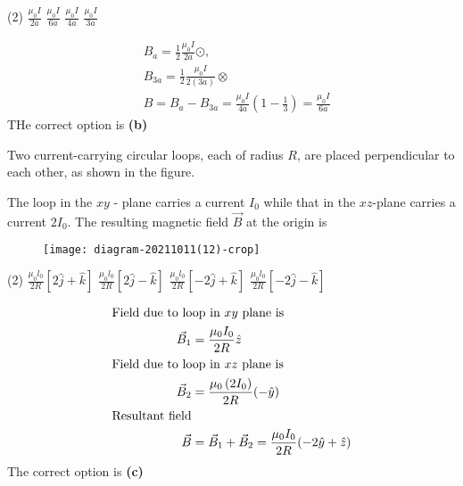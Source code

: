\begin{enumerate}
\begin{tasks}(2)
	\task[\textbf{A.}] $\frac{\mu_{0} I}{2 a}$
	\task[\textbf{B.}]$\frac{\mu_{0} I}{6 a}$
	\task[\textbf{C.}]$\frac{\mu_{0} I}{4 a}$
	\task[\textbf{D.}]$\frac{\mu_{0} I}{3 a}$
\end{tasks}
\begin{answer}
	\begin{align*}
	& B_{a}=\frac{1}{2} \frac{\mu_{0} I}{2 a} \odot,\\
	& B_{3 a}=\frac{1}{2} \frac{\mu_{0} I}{2(3 a)} \otimes \\
	&B=B_{a}-B_{3 a}=\frac{\mu_{0} I}{4 a}\left(1-\frac{1}{3}\right)=\frac{\mu_{0} I}{6 a}
	\end{align*}
	THe correct option is \textbf{(b)}	
\end{answer}
\begin{minipage}{\textwidth}
	\item Two current-carrying circular loops, each of radius $R$, are placed perpendicular to each other, as shown in the figure.
	
	The loop in the $x y$ - plane carries a current $I_{0}$ while that in the $x z$-plane carries a current $2 I_{0}$. The resulting magnetic field $\vec{B}$ at the origin is
	\begin{figure}[H]
		\centering
		\texttt{[image: diagram-20211011(12)-crop]}
	\end{figure}
\end{minipage}
\begin{tasks}(2)
	\task[\textbf{A.}] $\frac{\mu_{0} l_{0}}{2 R}[2 \hat{j}+\hat{k}]$ 
	\task[\textbf{B.}]$\frac{\mu_{0} l_{0}}{2 R}[2 \hat{j}-\hat{k}]$
	\task[\textbf{C.}]$\frac{\mu_{0} l_{0}}{2 R}[-2 \hat{j}+\hat{k}]$
	\task[\textbf{D.}]$\frac{\mu_{0} l_{0}}{2 R}[-2 \hat{j}-\hat{k}]$
\end{tasks}
\begin{answer}
	\begin{align*}
	\intertext{Field due to loop in $x y$ plane is} 
	\vec{B}_{1}&=\frac{\mu_{0} I_{0}}{2 R} \hat{z}\\
	\intertext{Field due to loop in $x z$ plane is}
	\vec{B}_{2}&=\frac{\mu_{0}\left(2 I_{0}\right)}{2 R}(-\hat{y})\\
	\text{Resultant field}\\
	 \vec{B}&=\vec{B}_{1}+\vec{B}_{2}=\frac{\mu_{0} I_{0}}{2 R}(-2 \hat{y}+\hat{z})
	\end{align*}
	The correct option is \textbf{(c)}	
\end{answer}
\end{enumerate}
